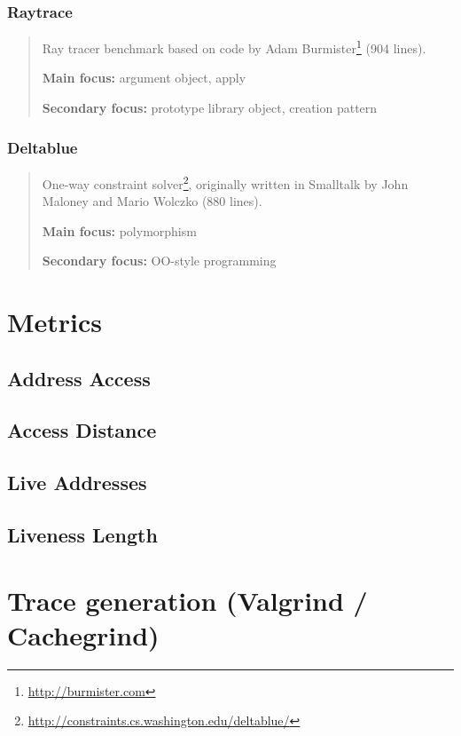 \documentclass[onecolumn, openany, master, english, seal, signatures]{dbrgrptt}
\begin{document}
\subsubsection{Raytrace}

\begin{quote}
Ray tracer benchmark based on code by Adam Burmister\footnote{\url{http://burmister.com}} (904 lines).

\textbf{Main focus:} argument object, apply

\textbf{Secondary focus:} prototype library object, creation pattern
\end{quote}

\subsubsection{Deltablue}

\begin{quote}
One-way constraint solver\footnote{\url{http://constraints.cs.washington.edu/deltablue/}}, originally written in Smalltalk by John Maloney and Mario Wolczko (880 lines).

\textbf{Main focus:} polymorphism

\textbf{Secondary focus:} OO-style programming
\end{quote}

\section{Metrics}
\subsection{Address Access}
\subsection{Access Distance}
\subsection{Live Addresses}
\subsection{Liveness Length}

\section{Trace generation (Valgrind / Cachegrind)}
\end{document}
